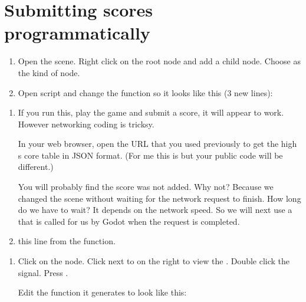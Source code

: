 \documentclass[letterpaper,10pt,english]{sphinxmanual}
\begin{document}
\section{Submitting scores programmatically}
\label{\detokenize{pandoc_tut:submitting-scores-programmatically}}\begin{enumerate}
%
\item {} 
\sphinxAtStartPar
Open the  scene.  Right click on the root node and add a child node.  Choose  as the kind of node.

\item {} 
\sphinxAtStartPar
Open  script and change the  function so it looks like this (3 new lines):

\end{enumerate}
\begin{enumerate}
%
\item {} 
\sphinxAtStartPar
If you run this, play the game and submit a score, it will appear to work.  However networking coding is tricksy.

\sphinxAtStartPar
In your web browser, open the URL that you used previously to get the high s core table in
JSON format.  (For me this is  but your
public code will be different.)

\sphinxAtStartPar
You will probably find the score was not added.  Why not?  Because we changed the scene without
waiting for the network request to finish.  How long do we have to wait?  It depends on the
network speed.  So we will next use a  that is called for us by Godot when the
request is completed.

\item {} 
\sphinxAtStartPar
{} this line from the  function.

\end{enumerate}

\begin{sphinxVerbatim}[commandchars=\\\{\}]
\end{sphinxVerbatim}
\begin{enumerate}
%
\item {} 
\sphinxAtStartPar
Click on the  node.  Click  next to  on the right to view the
.  Double click the  signal. Press .

\sphinxAtStartPar
Edit the function it generates to look like this:

\end{enumerate}
\end{document}
